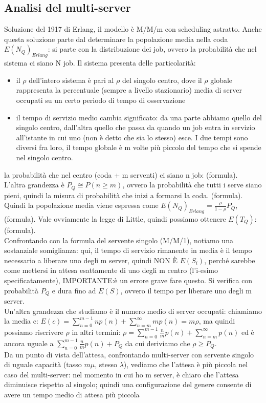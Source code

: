 \documentclass{article}
\begin{document}
\subsection{Analisi del multi-server}
Soluzione del 1917 di Erlang, il modello è M/M/m con scheduling astratto. Anche questa soluzione parte dal determinare la popolazione media nella coda $E(N_Q)_{Erlang}$: si parte con la distribuzione dei job, ovvero la probabilità che nel sistema ci siano N job. Il sistema presenta delle particolarità:
\begin{itemize}
\item il $\rho$ dell'intero sistema è pari al $\rho$ del singolo centro, dove il $\rho$ globale rappresenta la percentuale (sempre a livello stazionario) media di server occupati su un certo periodo di tempo di osservazione
\item il tempo di servizio medio cambia significato: da una parte abbiamo quello del singolo centro, dall'altra quello che passa da quando un job entra in servizio all'istante in cui uno (non è detto che sia lo stesso) esce. I due tempi sono diversi fra loro, il tempo globale è m volte più piccolo del tempo che si spende nel singolo centro.
\end{itemize}
la probabilità che nel centro (coda + m serventi) ci siano n job: (formula). \\ L'altra grandezza è $P_Q \cong P(n \geq m)$, ovvero la probabilità che tutti i serve siano pieni, quindi la misura di probabilità che inizi a formarsi la coda. (formula).\\ Quindi la popolazione media viene espressa come $E(N_Q)_{Erlang} = \frac{\rho}{1 - \rho}P_Q$, (formula). Vale ovviamente la legge di Little, quindi possiamo ottenere $E(T_Q):$ (formula).\\ Confrontando con la formula del servente singolo (M/M/1), notiamo una sostanziale somiglianza: qui, il tempo di servizio rimanente in media è il tempo necessario a liberare uno degli m server, quindi NON È $E(S_i)$, perché sarebbe come mettersi in attesa esattamente di uno degli m centro (l'i-esimo specificatamente), IMPORTANTE:è un errore grave fare questo. Si verifica con probabilità $P_Q$ e dura fino ad $E(S)$, ovvero il tempo per liberare uno degli m server.\\ Un'altra grandezza che studiamo è il numero medio di server occupati: chiamiamo la media c: $E(c) = \sum\limits_{n=0}^{m-1} np(n) + \sum\limits_{n=m}^{\infty} mp(n) = m \rho$, ma quindi possiamo riscrivere $\rho$ in altri termini: $\rho = \sum\limits_{n=0}^{m-1} \frac{n}{m}p(n) + \sum\limits_{n=m}^{\infty} p(n)$ ed è ancora uguale a $\sum\limits_{n=0}^{m-1} \frac{n}{m}p(n) + P_Q$ da cui deriviamo che $\rho \geq P_Q$.\\ Da un punto di vista dell'attesa, confrontando multi-server con servente singolo di uguale capacità (tasso $m \mu$, stesso $\lambda$), vediamo che l'attesa è più piccola nel caso del multi-server: nel momento in cui ho m server, è chiaro che l'attesa diminuisce rispetto al singolo; quindi una configurazione del genere consente di avere un tempo medio di attesa più piccola
\end{document}
